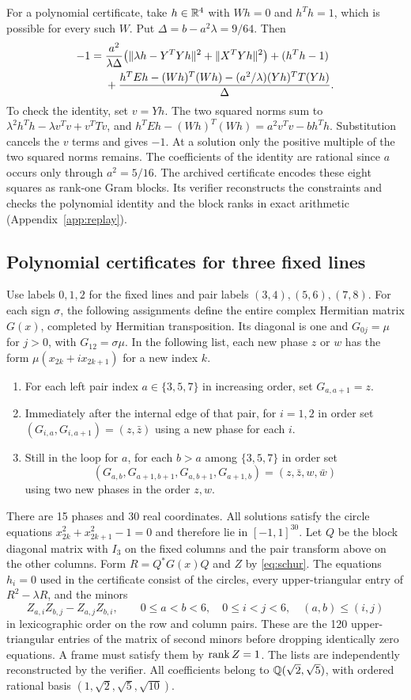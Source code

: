 For a polynomial certificate, take $h\in\mathbb R^4$ with $Wh=0$ and $h^Th=1$, which is possible for every such $W$. Put $\Delta=b-a^2\lambda=9/64$. Then
\begin{align}\label{eq:fixed1identity}
 -1={}&\frac{a^2}{\lambda\Delta}
 \bigl(\|\lambda h-Y^TYh\|^2+\|X^TYh\|^2\bigr)+(h^Th-1)\notag\\
 &+\frac{h^TEh-(Wh)^T(Wh)-(a^2/\lambda)(Yh)^TT(Yh)}{\Delta}.
\end{align}
To check the identity, set $v=Yh$. The two squared norms sum to $\lambda^2h^Th-\lambda v^Tv+v^TTv$, and $h^TEh-(Wh)^T(Wh)=a^2v^Tv-bh^Th$. Substitution cancels the $v$ terms and gives $-1$. At a solution only the positive multiple of the two squared norms remains. The coefficients of the identity are rational since $a$ occurs only through $a^2=5/16$. The archived certificate encodes these eight squares as rank-one Gram blocks. Its verifier reconstructs the constraints and checks the polynomial identity and the block ranks in exact arithmetic (Appendix~\ref{app:replay}).

\subsection{Polynomial certificates for three fixed lines}

Use labels $0,1,2$ for the fixed lines and pair labels $(3,4),(5,6),(7,8)$. For each sign $\sigma$, the following assignments define the entire complex Hermitian matrix $G(x)$, completed by Hermitian transposition. Its diagonal is one and $G_{0j}=\mu$ for $j>0$, with $G_{12}=\sigma\mu$. In the following list, each new phase $z$ or $w$ has the form $\mu(x_{2k}+i x_{2k+1})$ for a new index $k$.
\begin{enumerate}
\item For each left pair index $a\in\{3,5,7\}$ in increasing order, set $G_{a,a+1}=z$.
\item Immediately after the internal edge of that pair, for $i=1,2$ in order set $(G_{i,a},G_{i,a+1})=(z,\bar z)$ using a new phase for each $i$.
\item Still in the loop for $a$, for each $b>a$ among $\{3,5,7\}$ in order set
\[
 (G_{a,b},G_{a+1,b+1},G_{a,b+1},G_{a+1,b})=(z,\bar z,w,\bar w)
\]
using two new phases in the order $z,w$.
\end{enumerate}
There are 15 phases and 30 real coordinates. All solutions satisfy the circle equations $x_{2k}^2+x_{2k+1}^2-1=0$ and therefore lie in $[-1,1]^{30}$. Let $Q$ be the block diagonal matrix with $I_3$ on the fixed columns and the pair transform above on the other columns. Form $R=Q^*G(x)Q$ and $Z$ by \eqref{eq:schur}. The equations $h_i=0$ used in the certificate consist of the circles, every upper-triangular entry of $R^2-\lambda R$, and the minors
\[
 Z_{a,i}Z_{b,j}-Z_{a,j}Z_{b,i},
 \qquad 0\le a<b<6,\quad 0\le i<j<6,\quad (a,b)\le(i,j)
\]
in lexicographic order on the row and column pairs. These are the 120 upper-triangular entries of the matrix of second minors before dropping identically zero equations. A frame must satisfy them by $\operatorname{rank} Z=1$. The lists are independently reconstructed by the verifier. All coefficients belong to $\mathbb Q(\sqrt2,\sqrt5)$, with ordered rational basis $(1,\sqrt2,\sqrt5,\sqrt{10})$.

